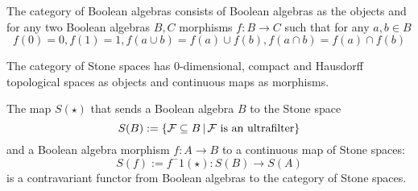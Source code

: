 \begin{dfn}
    The category of Boolean algebras consists of Boolean algebras as the objects
    and for any two Boolean algebras $B, C$ morphisms $f:B \to C$ such that
    for any $a,b \in B$
    \[f(0) = 0, f(1) = 1, f(a \cup b) = f(a) \cup f(b), 
    f(a \cap b) = f(a) \cap f(b)\] 
\end{dfn}

\begin{dfn}
    The category of Stone spaces has
    $0$-dimensional, 
    compact and Hausdorff topological spaces as objects and 
    continuous maps as morphisms.
\end{dfn}

\begin{prop}
    The map
    $S(\star)$ that sends a Boolean algebra $B$ to the Stone space
    \[S(B) := \left\{\mathcal{F} \subseteq B \,|\, \mathcal{F} \text{ is an ultrafilter}\right\}\]
    and a Boolean algebra morphism
    $f: A \to B$ to a continuous map of Stone spaces:
    \[S(f) := f^-1(\star) : S(B) \to S(A)\]
    is a contravariant functor from Boolean algebras to the category of Stone
    spaces.
\end{prop}

